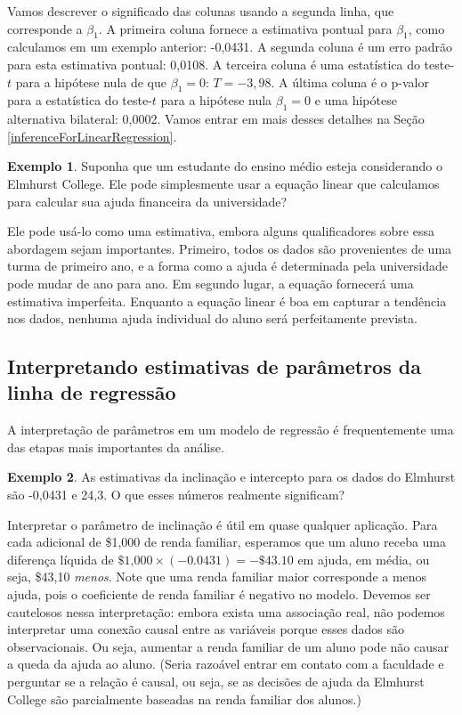 \documentclass[
]{book}
\theoremstyle{definition}
\theoremstyle{definition}
\newtheorem{example}{Exemplo}[chapter]
\theoremstyle{definition}
\theoremstyle{definition}
\theoremstyle{remark}
\begin{document}
Vamos descrever o significado das colunas usando a segunda linha, que corresponde a \(\beta_1\). A primeira coluna fornece a estimativa pontual para \(\beta_1\), como calculamos em um exemplo anterior: -0,0431. A segunda coluna é um erro padrão para esta estimativa pontual: 0,0108. A terceira coluna é uma estatística do teste-\(t\) para a hipótese nula de que \(\beta_1=0\): \(T = -3,98\). A última coluna é o p-valor para a estatística do teste-\(t\) para a hipótese nula \(\beta_1=0\) e uma hipótese alternativa bilateral: 0,0002. Vamos entrar em mais desses detalhes na Seção \ref{inferenceForLinearRegression}.

\begin{example}
\protect\hypertarget{exm:unnamed-chunk-276}{}{\label{exm:unnamed-chunk-276} }Suponha que um estudante do ensino médio esteja considerando o Elmhurst College. Ele pode simplesmente usar a equação linear que calculamos para calcular sua ajuda financeira da universidade?
\end{example}

Ele pode usá-lo como uma estimativa, embora alguns qualificadores sobre essa abordagem sejam importantes. Primeiro, todos os dados são provenientes de uma turma de primeiro ano, e a forma como a ajuda é determinada pela universidade pode mudar de ano para ano. Em segundo lugar, a equação fornecerá uma estimativa imperfeita. Enquanto a equação linear é boa em capturar a tendência nos dados, nenhuma ajuda individual do aluno será perfeitamente prevista.

\hypertarget{interpretingRegressionLineParameterEstimates}{%
\subsection{Interpretando estimativas de parâmetros da linha de regressão}\label{interpretingRegressionLineParameterEstimates}}

A interpretação de parâmetros em um modelo de regressão é frequentemente uma das etapas mais importantes da análise.

\begin{example}
\protect\hypertarget{exm:unnamed-chunk-277}{}{\label{exm:unnamed-chunk-277} }As estimativas da inclinação e intercepto para os dados do Elmhurst são -0,0431 e 24,3. O que esses números realmente significam?
\end{example}

Interpretar o parâmetro de inclinação é útil em quase qualquer aplicação. Para cada adicional de \$1,000 de renda familiar, esperamos que um aluno receba uma diferença líquida de \(\$\text{1,000}\times (-0.0431) = -\$43.10\) em ajuda, em média, ou seja, \$43,10 \emph{menos}. Note que uma renda familiar maior corresponde a menos ajuda, pois o coeficiente de renda familiar é negativo no modelo. Devemos ser cautelosos nessa interpretação: embora exista uma associação real, não podemos interpretar uma conexão causal entre as variáveis porque esses dados são observacionais. Ou seja, aumentar a renda familiar de um aluno pode não causar a queda da ajuda ao aluno. (Seria razoável entrar em contato com a faculdade e perguntar se a relação é causal, ou seja, se as decisões de ajuda da Elmhurst College são parcialmente baseadas na renda familiar dos alunos.)
\end{document}
